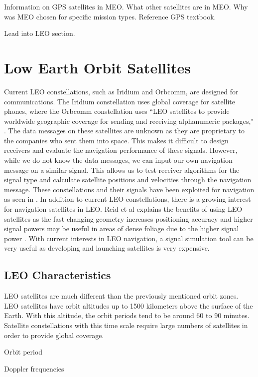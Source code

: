 \documentclass[12pt]{report}
\begin{document}
Information on GPS satellites in MEO. What other satellites are in MEO. Why was MEO chosen for specific mission types. Reference GPS textbook. 

Lead into LEO section. 

\section{Low Earth Orbit Satellites}
Current LEO constellations, such as Iridium and Orbcomm, are designed for communications. The Iridium constellation uses global coverage for satellite phones, where the Orbcomm constellation uses ``LEO satellites to provide worldwide geographic coverage for sending and receiving alphanumeric packages," \cite{orabiOpportunisticNavigationDoppler2021}. The data messages on these satellites are unknown as they are proprietary to the companies who sent them into space. This makes it difficult to design receivers and evaluate the navigation performance of these signals. However, while we do not know the data messages, we can input our own navigation message on a similar signal. This allows us to test receiver algorithms for the signal type and calculate satellite positions and velocities through the navigation message. These constellations and their signals have been exploited for navigation as seen in \cite{orabiOpportunisticNavigationDoppler2021}. In addition to current LEO constellations, there is a growing interest for navigation satellites in LEO. Reid et al explains the benefits of using LEO satellites as the fast changing geometry increases positioning accuracy and higher signal powers may be useful in areas of dense foliage due to the higher signal power \cite{reidSatelliteNavigationAge2020}. With current interests in LEO navigation, a signal simulation tool can be very useful as developing and launching satellites is very expensive.
\subsection{LEO Characteristics}

LEO satellites are much different than the previously mentioned orbit zones. LEO satellites have orbit altitudes up to 1500 kilometers above the surface of the Earth. With this altitude, the orbit periods tend to be around 60 to 90 minutes. Satellite constellations with this time scale require large numbers of satellites in order to provide global coverage.

Orbit period

Doppler frequencies
\end{document}
